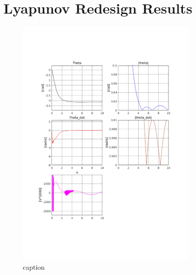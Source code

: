 \chapter{Lyapunov Redesign Results} %
\label{cha:lyapunov_redesign_results}
\begin{figure}[htbp]
        \centering
        \includegraphics[width=0.8\textwidth,trim=0.5cm 5cm 0.5cm 4cm, clip]{lyap.pdf}
        \caption{caption}
        \label{fig:label}
\end{figure}


